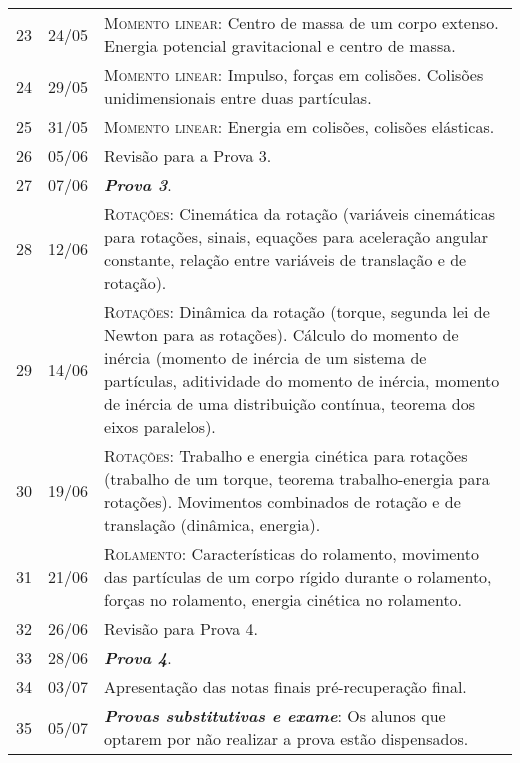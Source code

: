 \begin{center}
\begin{longtable}{ccp{70mm}}
23	 & 	24/05	 & 	\textsc{Momento linear:} Centro de massa de um corpo extenso. Energia potencial gravitacional e centro de massa. \\
24	 & 	29/05	 & 	\textsc{Momento linear:} Impulso, forças em colisões. Colisões unidimensionais entre duas partículas. \\
25	 & 	31/05	 & 	\textsc{Momento linear:} Energia em colisões, colisões elásticas. \\
26	 & 	05/06	 & 	Revisão para a Prova 3. \\
27	 & 	07/06	 & 	\textbf{\textit{Prova 3}}. \\
28	 & 	12/06	 & 	\textsc{Rotações:} Cinemática da rotação (variáveis cinemáticas para rotações, sinais, equações para aceleração angular constante, relação entre variáveis de translação e de rotação). \\
29	 & 	14/06	 & 	\textsc{Rotações:} Dinâmica da rotação (torque, segunda lei de Newton para as rotações). Cálculo do momento de inércia (momento de inércia de um sistema de partículas, aditividade do momento de inércia, momento de inércia de uma distribuição contínua, teorema dos eixos paralelos). \\
30	 & 	19/06	 & 	\textsc{Rotações:} Trabalho e energia cinética para rotações (trabalho de um torque, teorema trabalho-energia para rotações). Movimentos combinados de rotação e de translação (dinâmica, energia). \\
31	 & 	21/06	 & 	\textsc{Rolamento:} Características do rolamento, movimento das partículas de um corpo rígido durante o rolamento, forças no rolamento, energia cinética no rolamento. \\
32	 & 	26/06	 & 	Revisão para Prova 4. \\
33	 & 	28/06	 & 	\textbf{\textit{Prova 4}}. \\
34	 & 	03/07	 & 	Apresentação das notas finais pré-recuperação final. \\
35	 & 	05/07	 & 	\textbf{\textit{Provas substitutivas e exame}}: Os alunos que optarem por não realizar a prova estão dispensados. \\
\end{longtable}
\end{center}


\cleardoublepage


